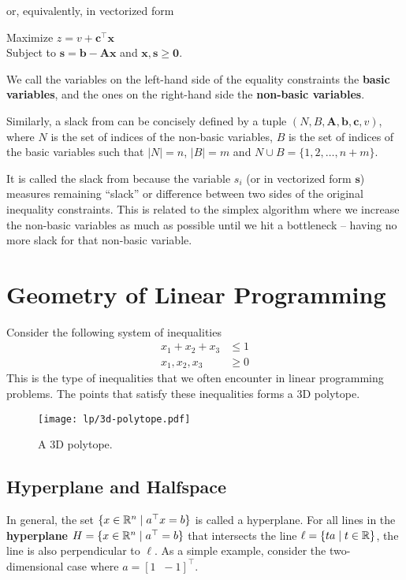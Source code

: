 or, equivalently, in vectorized form

Maximize $z = v + \mathbf{c}^\top \mathbf{x}$ \\
Subject to $\mathbf{s} = \mathbf{b} - \mathbf{A}\mathbf{x}$ and $\mathbf{x},\mathbf{s} \geq \boldsymbol{0}$.

We call the variables on the left-hand side of the equality constraints the \textbf{basic variables}, and the ones on the right-hand side the \textbf{non-basic variables}.

Similarly, a slack from can be concisely defined by a tuple $(N,B,\mathbf{A},\mathbf{b},\mathbf{c},v)$, where $N$ is the set of indices of the non-basic variables, $B$ is the set of indices of the basic variables such that $|N| = n$, $|B|=m$ and $N \cup B = \{1,2,\ldots,n+m\}$.

It is called the slack from because the variable $s_i$ (or in vectorized form $\mathbf{s}$) measures remaining ``slack'' or difference between two sides of the original inequality constraints. This is related to the simplex algorithm where we increase the non-basic variables as much as possible until we hit a bottleneck -- having no more slack for that non-basic variable.

\section{Geometry of Linear Programming}

Consider the following system of inequalities
$$
\begin{aligned}
    x_1 + x_2 + x_3 &\leq 1 \\
    x_1,x_2,x_3 &\geq 0
\end{aligned}
$$
This is the type of inequalities that we often encounter in linear programming problems. The points that satisfy these inequalities forms a 3D polytope.

\begin{figure}[htbp]
    \centering
    \texttt{[image: lp/3d-polytope.pdf]}
    \caption{A 3D polytope.}
    \label{fig:3d-polytope}
\end{figure}

\subsection{Hyperplane and Halfspace}   
In general, the set $\{ x \in \mathbb{R}^n \mid a^\top x = b \}$ is called a hyperplane. For all lines in the \textbf{hyperplane} $H = \{ x \in \mathbb{R}^n \mid a^\top = b \}$ that intersects the line $\ell = \{ta \mid t \in \mathbb{R}\}$, the line is also perpendicular to $\ell$. As a simple example, consider the two-dimensional case where $a = [1\;\;-1]^\top$.

